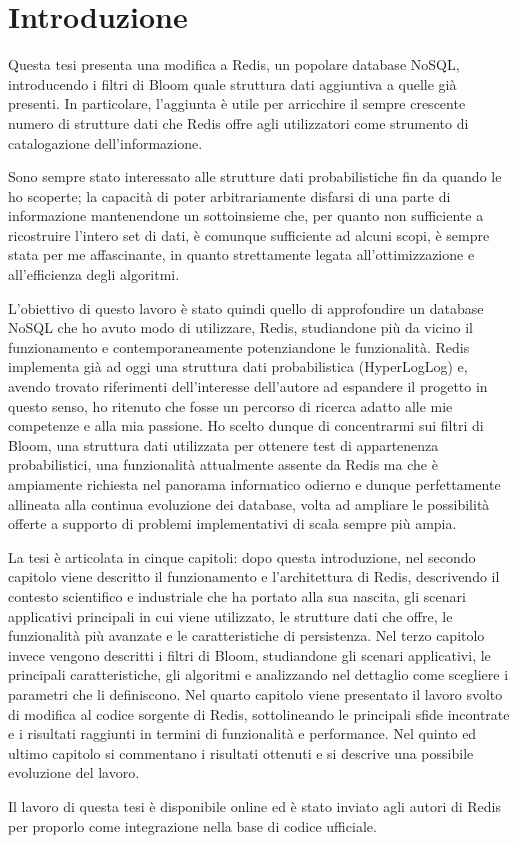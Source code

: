 \chapter{Introduzione}

Questa tesi presenta una modifica a Redis, un popolare database NoSQL, introducendo i filtri di
Bloom quale struttura dati aggiuntiva a quelle già presenti. In particolare, 
l'aggiunta è utile per arricchire il sempre crescente numero di strutture dati che Redis offre agli
utilizzatori come strumento di catalogazione dell'informazione.

Sono sempre stato interessato alle strutture dati probabilistiche fin da quando le ho scoperte; la
capacità di poter arbitrariamente disfarsi di una parte di informazione mantenendone un sottoinsieme
che, per quanto non sufficiente a ricostruire l'intero set di dati, è comunque sufficiente ad alcuni
scopi, è sempre stata per me affascinante, in quanto strettamente legata all'ottimizzazione e
all'efficienza degli algoritmi.

L'obiettivo di questo lavoro è stato quindi quello di approfondire un database NoSQL che ho avuto
modo di utilizzare, Redis, studiandone più da vicino il funzionamento e contemporaneamente
potenziandone le funzionalità. Redis implementa già ad oggi una struttura dati probabilistica
(HyperLogLog) e, avendo trovato riferimenti dell'interesse dell'autore ad espandere il progetto in
questo senso, ho ritenuto che fosse un percorso di ricerca adatto alle mie competenze e alla mia
passione. Ho scelto dunque di concentrarmi sui filtri di Bloom, una struttura dati utilizzata
per ottenere test di appartenenza probabilistici, una funzionalità attualmente assente da
Redis ma che è ampiamente richiesta nel panorama informatico odierno e dunque perfettamente
allineata alla continua evoluzione dei database, volta ad ampliare le possibilità offerte a
supporto di problemi implementativi di scala sempre più ampia.

La tesi è articolata in cinque capitoli: dopo questa introduzione, nel secondo capitolo viene
descritto il funzionamento e l'architettura di Redis, descrivendo il contesto scientifico e
industriale che ha portato alla sua nascita, gli scenari applicativi principali in cui viene
utilizzato, le strutture dati che offre, le funzionalità più avanzate e le caratteristiche di
persistenza. Nel terzo capitolo invece vengono descritti i filtri di Bloom, studiandone gli scenari
applicativi, le principali caratteristiche, gli algoritmi e analizzando nel dettaglio come scegliere
i parametri che li definiscono. Nel quarto capitolo viene presentato il lavoro svolto di modifica
al codice sorgente di Redis, sottolineando le principali sfide incontrate e i risultati raggiunti in
termini di funzionalità e performance. Nel quinto ed ultimo capitolo si commentano i risultati
ottenuti e si descrive una possibile evoluzione del lavoro.

Il lavoro di questa tesi è disponibile online ed è stato inviato agli autori di Redis per
proporlo come integrazione nella base di codice ufficiale.
